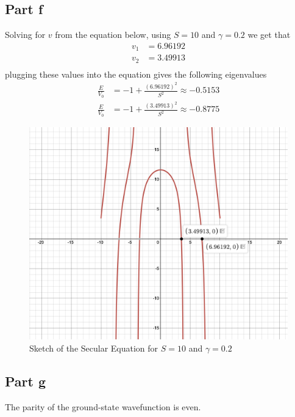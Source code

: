 \documentclass[12pt]{report}
\begin{document}
\subsection*{Part f}
Solving for $v$ from the equation below, using $S = 10$ and $\gamma = 0.2$ we get that
\begin{align*}
  v_1 &=   6.96192 \\
  v_2 &= 3.49913 \\
\end{align*}
plugging these values into the equation gives the following eigenvalues
\begin{align*}
  \frac{E}{V_0} &= -1 + \frac{(6.96192)^2}{S^2} \approx -0.5153\\
  \frac{E}{V_0} &= -1 + \frac{(3.49913)^2}{S^2} \approx -0.8775
\end{align*}

\begin{figure}[H]
    \centering
    \includegraphics[scale=0.4]{Secular_2.png}
    \caption{Sketch of the Secular Equation for $S=10$ and $\gamma = 0.2$}
    \label{fig:enter-label}
  \end{figure}
\subsection*{Part g}
The parity of the ground-state wavefunction is even.
\end{document}
